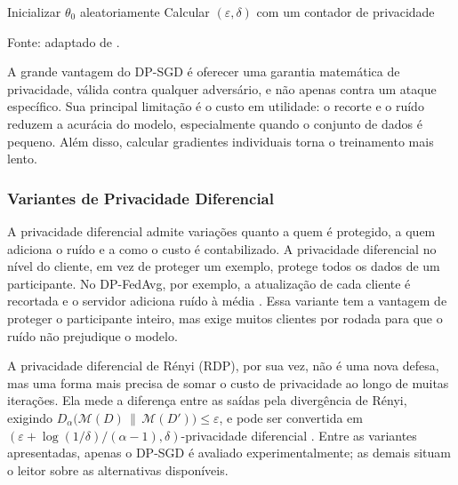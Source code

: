 \begin{algorithm2e}[H]
\caption{DP-SGD}
\label{alg:dpsgd}
Inicializar $\theta_0$ aleatoriamente\;
Calcular $(\varepsilon, \delta)$ com um contador de privacidade\;
\;
\end{algorithm2e}
\vspace{-4mm}
\begin{center}\small Fonte: adaptado de .\end{center}

A grande vantagem do DP-SGD é oferecer uma garantia matemática de privacidade, válida contra qualquer adversário, e não apenas contra um ataque específico. Sua principal limitação é o custo em utilidade: o recorte e o ruído reduzem a acurácia do modelo, especialmente quando o conjunto de dados é pequeno. Além disso, calcular gradientes individuais torna o treinamento mais lento.

\subsubsection{Variantes de Privacidade Diferencial}

A privacidade diferencial admite variações quanto a quem é protegido, a quem adiciona o ruído e a como o custo é contabilizado. A privacidade diferencial no nível do cliente, em vez de proteger um exemplo, protege todos os dados de um participante. No DP-FedAvg, por exemplo, a atualização de cada cliente é recortada e o servidor adiciona ruído à média \cite{McMahan2018}. Essa variante tem a vantagem de proteger o participante inteiro, mas exige muitos clientes por rodada para que o ruído não prejudique o modelo.

A privacidade diferencial de Rényi (RDP), por sua vez, não é uma nova defesa, mas uma forma mais precisa de somar o custo de privacidade ao longo de muitas iterações. Ela mede a diferença entre as saídas pela divergência de Rényi, exigindo $D_\alpha\big(\mathcal{M}(D) \,\|\, \mathcal{M}(D')\big) \leq \varepsilon$, e pode ser convertida em $(\varepsilon + \log(1/\delta)/(\alpha - 1), \delta)$-privacidade diferencial \cite{Mironov2017}. Entre as variantes apresentadas, apenas o DP-SGD é avaliado experimentalmente; as demais situam o leitor sobre as alternativas disponíveis.

